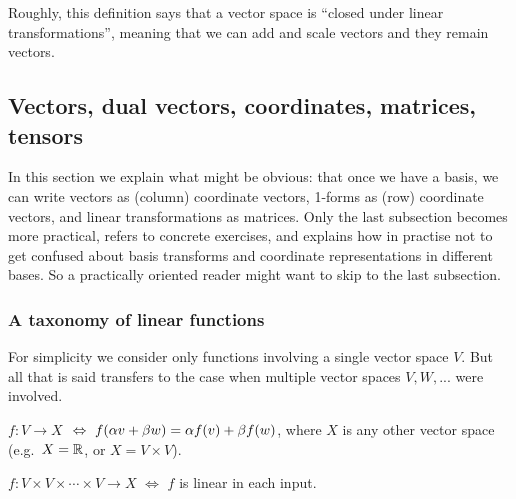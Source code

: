 Roughly, this definition says that a vector space is ``closed under
linear transformations'', meaning that we can add and scale vectors and
they remain vectors.


\subsection{Vectors, dual vectors, coordinates, matrices, tensors}

In this section we explain what might be obvious: that once we have a
basis, we can write vectors as (column) coordinate vectors, 1-forms as
(row) coordinate vectors, and linear transformations as matrices. Only
the last subsection becomes more practical, refers to concrete
exercises, and explains how in practise not to get confused about
basis transforms and coordinate representations in different bases. So
a practically oriented reader might want to skip to the last
subsection.


\subsubsection{A taxonomy of linear functions}

For simplicity we consider only functions involving a single vector
space $V$. But all that is said transfers to the case when multiple
vector spaces $V, W, ...$ were involved.

\begin{myDefinition}
$f:V \to X$  $~\Leftrightarrow~ f(\alpha v+\beta w) = \alpha f(v) + \beta f(w)$,
where $X$ is any other vector space (e.g.\ $X={\mathbb{R}}$, or $X=V\times V$).
\end{myDefinition}

\begin{myDefinition}
$f: V \times V \times \cdots \times V \to X$ 
$\iff$ $f$ is linear in each input.
\end{myDefinition}


